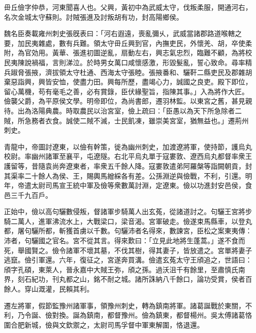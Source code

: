 
\begin{pinyinscope}
毌丘儉字仲恭，河東聞喜人也。父興，黃初中為武威太守，伐叛柔服，開通河右，名次金城太守蘇則。討賊張進及討叛胡有功，封高陽鄉侯。

魏名臣奏載雍州刺史張旣表曰：「河右遐遠，喪亂彌乆，武威當諸郡路道喉轄之要，加民夷雜處，數有兵難。領太守毌丘興到官，內撫吏民，外懷羌、胡，卒使柔附，為官効用。黃華、張進初圖逆亂，扇動左右，興志氣忠烈，臨難不顧，為將校民夷陳說禍福，言則涕泣。於時男女萬口咸懷感激，形毀髮亂，誓心致命。尋率精兵踧脅張掖，濟拔領太守杜通、西海太守張睦。張掖番和、驪靬二縣吏民及郡雜胡棄惡詣興，興皆安恤，使盡力田。興每所歷，盡竭心力，誠國之良吏。殿下即位，留心萬機，苟有毫毛之善，必有賞錄，臣伏緣聖旨，指陳其事。」入為將作大匠。儉襲父爵，為平原侯文學。明帝即位，為尚書郎，遷羽林監。以東宮之舊，甚見親待。出為洛陽典農。時取農民以治宮室，儉上疏曰：「臣愚以為天下所急除者二賊，所急務者衣食。誠使二賊不滅，士民飢凍，雖崇美宮室，猶無益也。」遷荊州刺史。

青龍中，帝圖討遼東，以儉有幹策，徙為幽州刺史，加渡遼將軍，使持節，護烏丸校尉。率幽州諸軍至襄平，屯遼隧。右北平烏丸單于寇婁敦、遼西烏丸都督率衆王護留等，昔隨袁尚奔遼東者，率衆五千餘人降。寇婁敦遣弟阿羅槃等詣闕朝貢，封其渠率二十餘人為侯、王，賜輿馬繒綵各有差。公孫淵逆與儉戰，不利，引還。明年，帝遣太尉司馬宣王統中軍及儉等衆數萬討淵，定遼東。儉以功進封安邑侯，食邑三千九百戶。

正始中，儉以高句驪數侵叛，督諸軍步騎萬人出玄菟，從諸道討之。句驪王宮將步騎二萬人，進軍沸流水上，大戰梁口，梁音渴。宮軍破走。儉遂束馬縣車，以登丸都，屠句驪所都，斬獲首虜以千數。句驪沛者名得來，數諫宮，臣松之案東夷傳：沛者，句驪國之官名。宮不從其言。得來歎曰：「立見此地將生蓬蒿。」遂不食而死，舉國賢之。儉令諸軍不壞其墓，不伐其樹，得其妻子，皆放遣之。宮單將妻子逃竄。儉引軍還。六年，復征之，宮遂奔買溝。儉遣玄菟太守王頎追之，世語曰：頎字孔碩，東萊人，晉永嘉中大賊王弥，頎之孫。過沃沮千有餘里，至肅慎氏南界，刻石紀功，刊丸都之山，銘不耐之城。諸所誅納八千餘口，論功受賞，侯者百餘人。穿山溉灌，民賴其利。

遷左將軍，假節監豫州諸軍事，領豫州刺史，轉為鎮南將軍。諸葛誕戰於東關，不利，乃令誕、儉對換。誕為鎮南，都督豫州。儉為鎮東，都督楊州。吳太傅諸葛恪圍合肥新城，儉與文欽禦之，太尉司馬孚督中軍東解圍，恪退還。


\end{pinyinscope}
